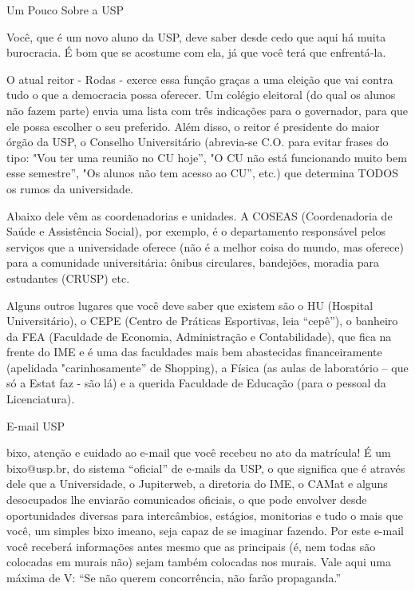 \begin{secao}{Um Pouco Sobre a USP}

Você, que é um novo aluno da USP, deve saber desde cedo que aqui há muita
burocracia. É bom que se acostume com ela, já que você terá que enfrentá-la. 

O atual reitor - Rodas - exerce essa função graças a uma eleição que vai contra
tudo o que a democracia possa oferecer. Um colégio eleitoral (do qual os alunos
não fazem parte) envia uma lista com três indicações para o governador, para que
ele possa escolher o seu preferido. Além disso, o reitor é presidente do maior
órgão da USP, o Conselho Universitário (abrevia-se C.O. para evitar frases do
tipo: "Vou ter uma reunião no CU hoje”, "O CU não está funcionando muito bem
esse semestre”, "Os alunos não tem acesso ao CU”, etc.) que determina TODOS os
rumos da universidade.

Abaixo dele vêm as coordenadorias e unidades. A COSEAS (Coordenadoria de Saúde
e Assistência Social), por exemplo, é o departamento responsável pelos serviços
que a universidade oferece (não é a melhor coisa do mundo, mas oferece) para a
comunidade universitária: ônibus circulares, bandejões, moradia para estudantes
(CRUSP) etc.

Alguns outros lugares que você deve saber que existem são o HU (Hospital
Universitário), o CEPE (Centro de Práticas Esportivas, leia “cepê”), o banheiro
da FEA (Faculdade de Economia, Administração e Contabilidade), que fica na
frente do IME e é uma das faculdades mais bem abastecidas financeiramente
(apelidada "carinhosamente” de Shopping), a Física (as aulas de laboratório –
que só a Estat faz - são lá) e a querida Faculdade de Educação (para o pessoal
da Licenciatura).

\begin{subsecao}{E-mail USP}

bixo, atenção e cuidado ao e-mail que você recebeu no ato da matrícula! É um
bixo@usp.br, do sistema “oficial” de e-mails da USP, o que significa que é
através dele que a Universidade, o Jupiterweb, a diretoria do IME, o CAMat e
alguns desocupados lhe enviarão comunicados oficiais, o que pode envolver desde
oportunidades diversas para intercâmbios, estágios, monitorias e tudo o mais que
você, um simples bixo imeano, seja capaz de se imaginar fazendo. Por este e-mail
você receberá informações antes mesmo que as principais (é, nem todas são
colocadas em murais não) sejam também colocadas nos murais. Vale aqui uma máxima
de V: “Se não querem concorrência, não farão propaganda.” 


\end{subsecao}
\end{secao}
